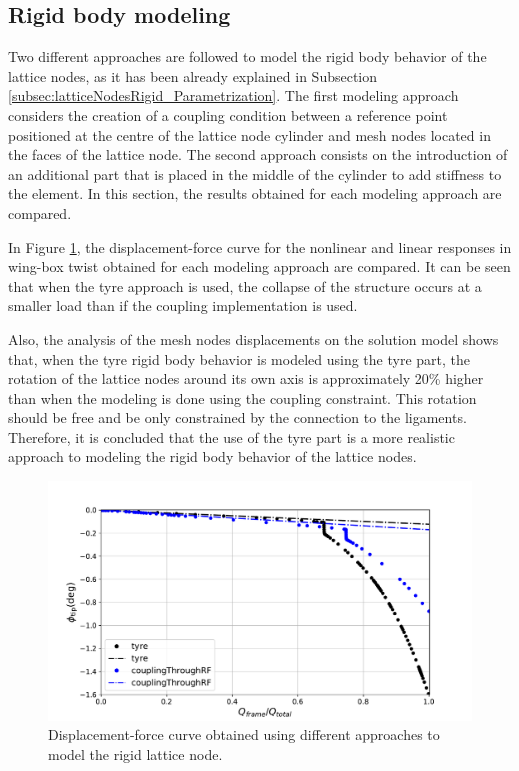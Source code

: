   \subsection{Rigid body modeling} \label{subsec:rigidBody_results_model} %
    
    Two different approaches are followed to model the rigid body behavior of the lattice nodes, as it has been already explained in Subsection \ref{subsec:latticeNodesRigid_Parametrization}. The first modeling approach considers the creation of a coupling condition between a reference point positioned at the centre of the lattice node cylinder and mesh nodes located in the faces of the lattice node. The second approach consists on the introduction of an additional part that is placed in the middle of the cylinder to add stiffness to the element. In this section, the results obtained for each modeling approach are compared.

    In Figure \ref{fig:rigid-modeling}, the displacement-force curve for the nonlinear and linear responses in wing-box twist obtained for each modeling approach are compared. It can be seen that when the tyre approach is used, the collapse of the structure occurs at a smaller load than if the coupling implementation is used.

    Also, the analysis of the mesh nodes displacements on the solution model shows that, when the tyre rigid body behavior is modeled using the tyre part, the rotation of the lattice nodes around its own axis is approximately 20\% higher than when the modeling is done using the coupling constraint. This rotation should be free and be only constrained by the connection to the ligaments. Therefore, it is concluded that the use of the tyre part is a more realistic approach to modeling the rigid body behavior of the lattice nodes.

    \begin{figure}[!htpb]
      \centering
      \includegraphics[width=0.8 \textwidth]{figures/result-model/rigid-modeling}
      \caption[Displacement-force curve obtained using different approaches to model the rigid lattice node]{Displacement-force curve obtained using different approaches to model the rigid lattice node. }\label{fig:rigid-modeling}
    \end{figure}

